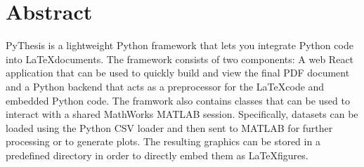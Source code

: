 \clearpage
\thispagestyle{empty}
\section*{Abstract}
PyThesis is a lightweight Python framework that lets you integrate Python code into \LaTeX documents. The framework consists of two components: A web React application that can be used to quickly build and view the final PDF document and a Python backend that acts as a preprocessor for the \LaTeX code and embedded Python code. The framwork also contains classes that can be used to interact with a shared MathWorks MATLAB session. Specifically, datasets can be loaded using the Python CSV loader and then sent to MATLAB for further processing or to generate plots. The resulting graphics can be stored in a predefined directory in order to directly embed them as \LaTeX figures.
\clearpage
